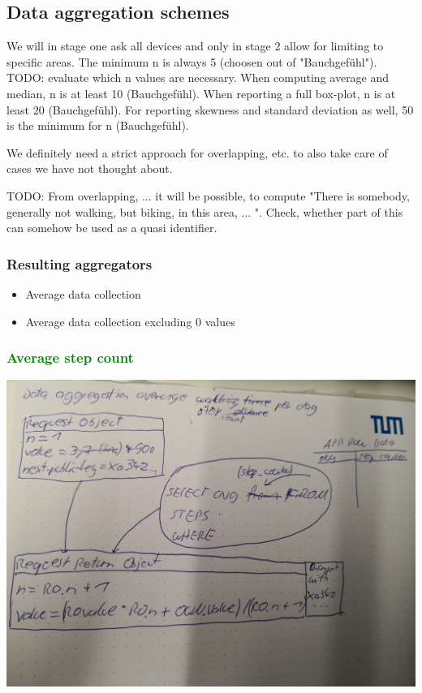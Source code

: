 \subsection{Data aggregation schemes}
We will in stage one ask all devices and only in stage 2 allow for limiting to specific areas. The minimum n is always 5 (choosen out of "Bauchgefühl").
TODO: evaluate which n values are necessary.
When computing average and median, n is at least 10 (Bauchgefühl).
When reporting a full box-plot, n is at least 20 (Bauchgefühl). 
For reporting skewness and standard deviation as well, 50 is the minimum for n (Bauchgefühl).

We definitely need a strict approach for overlapping, etc. to also take care of cases we have not thought about.

TODO: From overlapping, ... it will be possible, to compute "There is somebody, generally not walking, but biking, in this area, ... ". Check, whether part of this can somehow be used as a quasi identifier.
\subsubsection{Resulting aggregators}
\begin{itemize}
	\item Average data collection
	\item Average data collection excluding 0 values
\end{itemize}

\subsubsection{\textcolor{green}{Average step count}}
\includegraphics[width=\textwidth]{data/data-aggregation-average-step.jpg}

